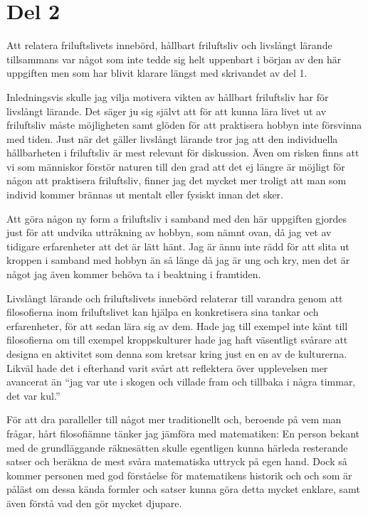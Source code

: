 \documentclass[12pt]{article}   %
\begin{document}
\section*{Del 2}

%

Att relatera friluftslivets innebörd, hållbart friluftsliv och livslångt lärande tillsammans var
något som inte tedde sig helt uppenbart i början av den här uppgiften men som har blivit klarare
längst med skrivandet av del 1.

Inledningsvis skulle jag vilja motivera vikten av hållbart friluftsliv har för livslångt lärande.
Det säger ju sig självt att för att kunna lära livet ut av friluftsliv måste möjligheten samt
glöden för att praktisera hobbyn inte försvinna med tiden. Just när det gäller livslångt
lärande tror jag att den individuella hållbarheten i friluftsliv är mest relevant för diskussion.
Även om risken finns att vi som människor förstör naturen till den grad att det ej längre
är möjligt för någon att praktisera friluftsliv, finner jag det mycket mer troligt att man som individ
kommer brännas ut mentalt eller fysiskt innan det sker.

Att göra någon ny form a friluftsliv
i samband med den här uppgiften gjordes just för att undvika uttråkning av hobbyn, som nämnt
ovan, då jag vet av tidigare erfarenheter att det är lätt hänt. Jag är ännu inte rädd för att slita
ut kroppen i samband med hobbyn än så länge då jag är ung och kry, men det är något jag även
kommer behöva ta i beaktning i framtiden.

Livslångt lärande och friluftslivets innebörd relaterar till varandra genom att filosofierna
inom friluftslivet kan hjälpa en konkretisera sina tankar och erfarenheter, för att sedan
lära sig av dem. Hade jag till exempel inte känt till filosofierna om till exempel kroppskulturer
hade jag haft väsentligt svårare att designa en aktivitet som denna som kretsar
kring just en en av de kulturerna. Likväl hade det i efterhand varit svårt att
reflektera över upplevelsen mer avancerat än ``jag var ute i skogen och villade fram
och tillbaka i några timmar, det var kul.''

För att dra paralleller till något mer traditionellt och, beroende på vem man frågar, hårt
filosofiämne tänker jag jämföra med matematiken: En person bekant med de grundläggande räknesätten
skulle egentligen kunna härleda resterande satser och beräkna de mest svåra matematiska
uttryck på egen hand. Dock så kommer personen med god förståelse för matematikens historik och
och som är påläst om dessa kända formler och satser kunna göra detta mycket enklare, samt
även förstå vad den gör mycket djupare.
\end{document}

